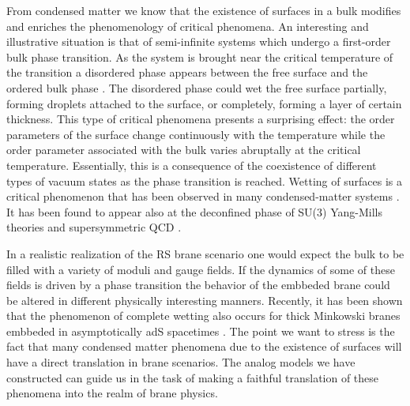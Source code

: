 \documentclass[a4paper,prl,showpacs,twocolumn]{revtex4}
\begin{document}
From condensed matter we know that the existence of surfaces in 
a bulk modifies and enriches the phenomenology of critical 
phenomena.
An interesting and illustrative situation is that of semi-infinite 
systems which
undergo a first-order bulk phase transition.
As the system is brought near the critical temperature of the
transition a disordered phase appears between the free surface
and the ordered bulk phase \cite{Lip:1982}.
The disordered phase could wet the free surface
partially, forming droplets attached to the surface, or completely, 
forming a layer of certain thickness. 
This type of critical phenomena presents a surprising effect:
the order parameters of the surface change continuously with 
the temperature while the order parameter associated with the
bulk varies abruptally at the critical temperature.
Essentially, this is a consequence of the coexistence of different 
types of vacuum states as the phase transition is reached.
Wetting of surfaces is a critical phenomenon that has been 
observed in many condensed-matter systems \cite{deG:1985}.
It has been found to appear also at the deconfined phase of SU(3) 
Yang-Mills theories \cite{wet_QCD} and supersymmetric QCD 
\cite{wet_SQCD}.

In a realistic realization of the RS brane 
scenario one would expect the bulk to be filled with a variety
of moduli and gauge fields. 
If the dynamics of some of these fields is driven by a phase 
transition the behavior of the embbeded brane could be altered
in different physically interesting manners.
Recently, it has been shown that the phenomenon of complete wetting 
also occurs for thick Minkowski branes embbeded in asymptotically adS 
spacetimes \cite{Cam:2002}.
The point we want to stress is the fact
that many condensed matter phenomena due to the existence
of surfaces will have a direct translation in brane scenarios.
The analog models we have constructed can guide us in the task 
of making a faithful translation of these phenomena into the 
realm of brane physics.
\end{document}
